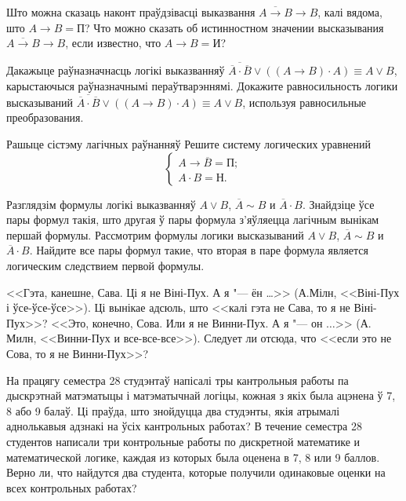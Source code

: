 \begin{problemList}

\problemItemSimple
{Што можна сказаць наконт праўдзівасці выказвання  $\overline{A \to B} \to B$, калі вядома, што $A \to B = \mbox{П}$?}
{Что можно сказать об истинностном значении высказывания $\overline{A \to B} \to B$, если известно, что $A \to B = \mbox{И}$?}

\bigskip

\problemItemSimple
{Дакажыце раўназначнасць логікі выказванняў $\overline{\overline{A} \cdot \overline{B}} \vee ((A \to B) \cdot A) \equiv A \vee B$, карыстаючыся раўназначнымі пераўтварэннямі.}
{Докажите равносильность логики высказываний $\overline{\overline{A} \cdot \overline{B}} \vee ((A \to B) \cdot A) \equiv A \vee B$, используя равносильные преобразования.}

\bigskip

\problemItemWithCommonPart
{Рашыце сістэму лагічных раўнанняў}
{Решите систему логических уравнений
{\[\begin{cases} A \to \overline{B} = \mbox{П}; \\ A \cdot B = \mbox{Н}. \end{cases}\]}}

\smallskip

\problemItemSimple
{Разглядзім формулы логікі выказванняў $A \vee B$, $\overline{A} \sim B$ и $\overline{A} \cdot B$. Знайдзіце ўсе пары формул такія, што другая ў пары формула з'яўляецца лагічным вынікам першай формулы.}
{Рассмотрим формулы логики высказываний $A \vee B$, $\overline{A} \sim B$ и $\overline{A} \cdot B$. Найдите все пары формул такие, что вторая в паре формула является логическим следствием первой формулы.}

\bigskip

\problemItemSimple
{<<Гэта, канешне, Сава. Ці я не Віні-Пух. А я "--- ён \dots>> (А.Мілн, <<Віні-Пух і ўсе-ўсе-ўсе>>). Ці вынікае адсюль, што <<калі гэта не Сава, то я не Віні-Пух>>?}
{<<Это, конечно, Сова. Или я не Винни-Пух. А я "--- он $\ldots$>> (А. Милн, <<Винни-Пух и все-все-все>>). Следует ли отсюда, что <<если это не Сова, то я не Винни-Пух>>?}

\bigskip

\problemItemSimple
{На працягу семестра 28 студэнтаў напісалі тры кантрольныя работы па дыскрэтнай матэматыцы і матэматычнай логіцы, кожная з якіх была ацэнена ў 7, 8 або 9 балаў. Ці праўда, што знойдуцца два студэнты, якія атрымалі аднолькавыя адзнакі на ўсіх кантрольных работах?}
{В течение семестра 28 студентов написали три контрольные работы по дискретной математике и математической логике, каждая из которых была оценена в 7, 8 или 9 баллов. Верно ли, что найдутся два студента, которые получили одинаковые оценки на всех контрольных работах?}


\end{problemList}
